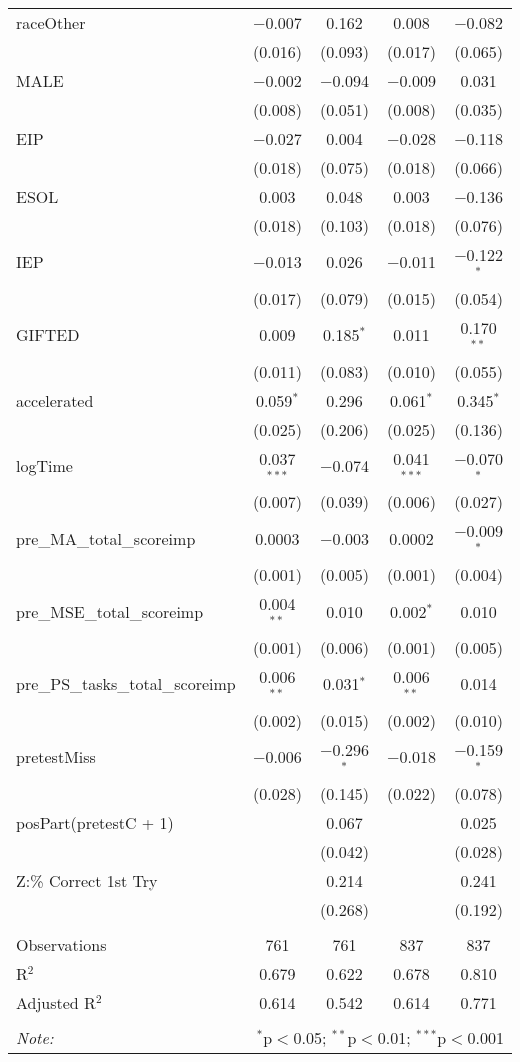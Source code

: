 \begin{table}[!htbp]
\begin{tabular}{@{\extracolsep{5pt}}lcccc}
 raceOther & $-$0.007 & 0.162 & 0.008 & $-$0.082 \\ 
  & (0.016) & (0.093) & (0.017) & (0.065) \\ 
 MALE & $-$0.002 & $-$0.094 & $-$0.009 & 0.031 \\ 
  & (0.008) & (0.051) & (0.008) & (0.035) \\ 
 EIP & $-$0.027 & 0.004 & $-$0.028 & $-$0.118 \\ 
  & (0.018) & (0.075) & (0.018) & (0.066) \\ 
 ESOL & 0.003 & 0.048 & 0.003 & $-$0.136 \\ 
  & (0.018) & (0.103) & (0.018) & (0.076) \\ 
 IEP & $-$0.013 & 0.026 & $-$0.011 & $-$0.122$^{*}$ \\ 
  & (0.017) & (0.079) & (0.015) & (0.054) \\ 
 GIFTED & 0.009 & 0.185$^{*}$ & 0.011 & 0.170$^{**}$ \\ 
  & (0.011) & (0.083) & (0.010) & (0.055) \\ 
 accelerated & 0.059$^{*}$ & 0.296 & 0.061$^{*}$ & 0.345$^{*}$ \\ 
  & (0.025) & (0.206) & (0.025) & (0.136) \\ 
 logTime & 0.037$^{***}$ & $-$0.074 & 0.041$^{***}$ & $-$0.070$^{*}$ \\ 
  & (0.007) & (0.039) & (0.006) & (0.027) \\ 
 pre\_MA\_total\_scoreimp & 0.0003 & $-$0.003 & 0.0002 & $-$0.009$^{*}$ \\ 
  & (0.001) & (0.005) & (0.001) & (0.004) \\ 
 pre\_MSE\_total\_scoreimp & 0.004$^{**}$ & 0.010 & 0.002$^{*}$ & 0.010 \\ 
  & (0.001) & (0.006) & (0.001) & (0.005) \\ 
 pre\_PS\_tasks\_total\_scoreimp & 0.006$^{**}$ & 0.031$^{*}$ & 0.006$^{**}$ & 0.014 \\ 
  & (0.002) & (0.015) & (0.002) & (0.010) \\ 
 pretestMiss & $-$0.006 & $-$0.296$^{*}$ & $-$0.018 & $-$0.159$^{*}$ \\ 
  & (0.028) & (0.145) & (0.022) & (0.078) \\ 
 posPart(pretestC + 1) &  & 0.067 &  & 0.025 \\ 
  &  & (0.042) &  & (0.028) \\ 
 Z:\% Correct 1st Try &  & 0.214 &  & 0.241 \\ 
  &  & (0.268) &  & (0.192) \\ 
\hline \\[-1.8ex] 
Observations & 761 & 761 & 837 & 837 \\ 
R$^{2}$ & 0.679 & 0.622 & 0.678 & 0.810 \\ 
Adjusted R$^{2}$ & 0.614 & 0.542 & 0.614 & 0.771 \\ 
\hline 
\hline \\[-1.8ex] 
\textit{Note:}  & \multicolumn{4}{r}{$^{*}$p$<$0.05; $^{**}$p$<$0.01; $^{***}$p$<$0.001} \\ 
\end{tabular} 
\end{table} 
